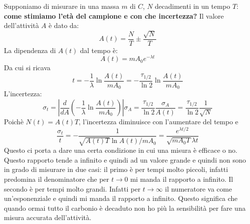 Supponiamo di misurare in una massa $m$ di $C$, $N$ decadimenti in un tempo $T$: \textbf{come stimiamo l'età del campione e con che incertezza?} Il valore dell'attività $A$ è dato da:
\begin{equation*}
    A(t)=\frac{N}{T}\pm\frac{\sqrt{N}}{T}
\end{equation*}
La dipendenza di $A(t)$ dal tempo è:
\begin{equation*}
   A(t)= mA_0e^{-\lambda t}
\end{equation*}
Da cui si ricava
\begin{equation*}
    t=-\frac{1}{\lambda}\ln{\frac{A(t)}{mA_0}}=-\frac{\tau_{1/2}}{\ln{2}}\ln{\frac{A(t)}{mA_0}}
\end{equation*}
L'incertezza:
\begin{equation*}
    \sigma_t=\left| \frac{d}{dA}(-\frac{1}{\lambda}\ln{\frac{A(t)}{mA_0}}) \right|\sigma_A=\frac{\tau_{1/2}}{\ln{2}}\frac{\sigma_A}{A(t)}=\frac{\tau_{1/2}}{\ln{2}}\frac{1}{\sqrt{N}}
\end{equation*}
Poichè $N(t)=A(t)T$, l'incertezza diminuisce con l'aumentare del tempo e 
\begin{equation*}
    \frac{\sigma_t}{t}=-\frac{1}{\sqrt{A(t)T}\ln{A(t)/mA_0}}=\frac{e^{\lambda t/2}}{\sqrt{mA_0T}\lambda t}
\end{equation*}
Questo ci porta a dare una certa condizione in cui una misura è efficace o no. Questo rapporto tende a infinito e quindi ad un valore grande e quindi non sono in grado di misurare in due casi: il primo è per tempi molto piccoli, infatti predomina il denominatore che per $t\to0$ mi manda il rapporto a infinito. Il secondo è per tempi molto grandi. Infatti per $t\to \infty$ il numeratore va come un'esponenziale e quindi mi manda il rapporto a infinito. Questo significa che quando ormai tutto il carbonio è decaduto non ho più la sensibilità per fare una misura accurata dell'attività.